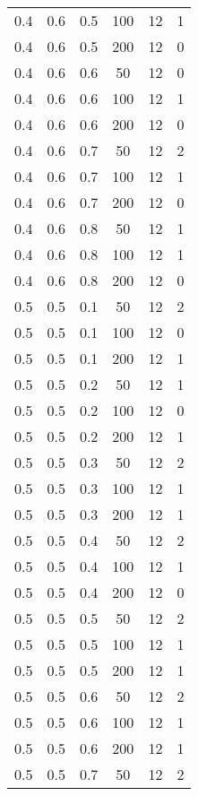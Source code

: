 \begin{center}
\begin{longtable}[c]{|c|c|c|c|c|c|}
	0.4 &  0.6 &  0.5 &  100 &    12 &     1 \\
	0.4 &  0.6 &  0.5 &  200 &    12 &     0 \\
   \hline
	0.4 &  0.6 &  0.6 &   50 &    12 &     0 \\
	0.4 &  0.6 &  0.6 &  100 &    12 &     1 \\
	0.4 &  0.6 &  0.6 &  200 &    12 &     0 \\
   \hline
	0.4 &  0.6 &  0.7 &   50 &    12 &     2 \\
	0.4 &  0.6 &  0.7 &  100 &    12 &     1 \\
	0.4 &  0.6 &  0.7 &  200 &    12 &     0 \\
   \hline
	0.4 &  0.6 &  0.8 &   50 &    12 &     1 \\
	0.4 &  0.6 &  0.8 &  100 &    12 &     1 \\
	0.4 &  0.6 &  0.8 &  200 &    12 &     0 \\
   \hline
	0.5 &  0.5 &  0.1 &   50 &    12 &     2 \\
	0.5 &  0.5 &  0.1 &  100 &    12 &     0 \\
	0.5 &  0.5 &  0.1 &  200 &    12 &     1 \\
   \hline
	0.5 &  0.5 &  0.2 &   50 &    12 &     1 \\
	0.5 &  0.5 &  0.2 &  100 &    12 &     0 \\
	0.5 &  0.5 &  0.2 &  200 &    12 &     1 \\
   \hline
	0.5 &  0.5 &  0.3 &   50 &    12 &     2 \\
	0.5 &  0.5 &  0.3 &  100 &    12 &     1 \\
	0.5 &  0.5 &  0.3 &  200 &    12 &     1 \\
   \hline
	0.5 &  0.5 &  0.4 &   50 &    12 &     2 \\
	0.5 &  0.5 &  0.4 &  100 &    12 &     1 \\
	0.5 &  0.5 &  0.4 &  200 &    12 &     0 \\
   \hline
	0.5 &  0.5 &  0.5 &   50 &    12 &     2 \\
	0.5 &  0.5 &  0.5 &  100 &    12 &     1 \\
	0.5 &  0.5 &  0.5 &  200 &    12 &     1 \\
   \hline
	0.5 &  0.5 &  0.6 &   50 &    12 &     2 \\
	0.5 &  0.5 &  0.6 &  100 &    12 &     1 \\
	0.5 &  0.5 &  0.6 &  200 &    12 &     1 \\
   \hline
	0.5 &  0.5 &  0.7 &   50 &    12 &     2 \\

\end{longtable}
\end{center}
